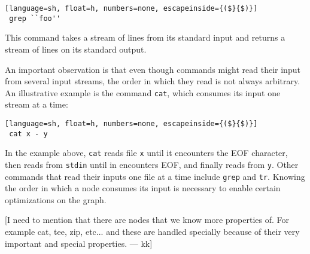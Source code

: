 \documentclass[letterpaper,twocolumn,10pt]{article}
\newcommand{\ttt}[1]{\texttt{\small #1}}
\newcommand{\kk}[1]{[{\color{magenta}#1 --- kk}]}
\begin{document}
\begin{lstlisting}[language=sh, float=h, numbers=none, escapeinside={($}{$)}]
 grep ``foo''
\end{lstlisting}

\noindent
This command takes a stream of lines from its standard input and
returns a stream of lines on its standard output.

An important observation is that even though commands might read their
input from several input streams, the order in which they read is not
always arbitrary. An illustrative example is the command \ttt{cat},
which consumes its input one stream at a time:

\begin{lstlisting}[language=sh, float=h, numbers=none, escapeinside={($}{$)}]
 cat x - y
\end{lstlisting}

\noindent
In the example above, \ttt{cat} reads file \ttt{x} until it encounters
the EOF character, then reads from \ttt{stdin} until in encounters
EOF, and finally reads from \ttt{y}. Other commands that read their
inputs one file at a time include \ttt{grep} and \ttt{tr}. Knowing the
order in which a node consumes its input is necessary to enable
certain optimizations on the graph.



\kk{I need to mention that there are nodes that we know more
  properties of. For example cat, tee, zip, etc... and these are
  handled specially because of their very important and special
  properties.}



\end{document}
